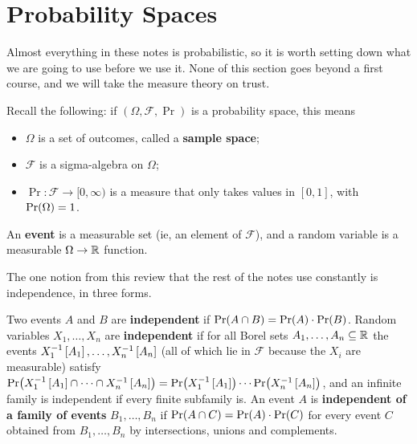 \section{Probability Spaces} \label{Ch1:Sec:Prob_Spaces}

Almost everything in these notes is probabilistic, so it is worth setting down what we are going to use before we use it. None of this section goes beyond a first course, and we will take the measure theory on trust.

Recall the following: if $(\Omega, \mathcal{F}, \Pr)$ is a probability space, this means
\begin{itemize}
    \item $\Omega$ is a set of outcomes, called a \textbf{sample space};
    \item $\mathcal{F}$ is a sigma-algebra on $\Omega$;
    \item $\Pr : \mathcal{F} \to [0, \infty)$ is a measure that only takes values in $[0, 1]$, with $\Pr\!\left( \Omega \right) = 1$.
\end{itemize}
An \textbf{event} is a measurable set (ie, an element of $\mathcal{F}$), and a random variable is a measurable $\Omega \to \mathbb{R}$ function.

The one notion from this review that the rest of the notes use constantly is independence, in three forms.

\begin{boxdefinition}[Independence] \label{Ch1:Def:Independence}
    Two events $A$ and $B$ are \textbf{independent} if $\Pr\!\left( A \cap B \right) = \Pr(A) \cdot \Pr(B)$. Random variables $X_1, \ldots, X_n$ are \textbf{independent} if for all Borel sets $A_1, \ldots, A_n \subseteq \mathbb{R}$ the events $X_1^{-1}\left[ A_1 \right], \ldots, X_n^{-1}\left[ A_n \right]$ (all of which lie in $\mathcal{F}$ because the $X_i$ are measurable) satisfy $\Pr\!\left( X_1^{-1}\left[ A_1 \right] \cap \cdots \cap X_n^{-1}\left[ A_n \right] \right) = \Pr\!\left( X_1^{-1}\left[ A_1 \right] \right) \cdots \Pr\!\left( X_n^{-1}\left[ A_n \right] \right)$, and an infinite family is independent if every finite subfamily is. An event $A$ is \textbf{independent of a family of events} $B_1, \ldots, B_n$ if $\Pr\!\left( A \cap C \right) = \Pr(A) \cdot \Pr(C)$ for every event $C$ obtained from $B_1, \ldots, B_n$ by intersections, unions and complements.
\end{boxdefinition}

